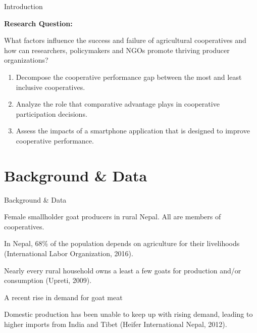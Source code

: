 \documentclass[aspectratio=169]{beamer}
\newenvironment{wideitemize}{\itemize\addtolength{\itemsep}{10pt}}{\enditemize}
\begin{document}
\begin{frame}{Introduction}

\textbf{Research Question:} \vspace{.5cm}
    \begin{wideitemize}
        \item What factors influence the success and failure of agricultural cooperatives and how can researchers, policymakers and NGOs promote thriving producer organizations? \vspace{.25cm}
            \begin{enumerate}
                \item Decompose the cooperative performance gap between the most and least inclusive cooperatives. \vspace{.25cm}
                \item Analyze the role that comparative advantage plays in cooperative participation decisions. \vspace{.25cm}
                \item Assess the impacts of a smartphone application that is designed to improve cooperative performance.
            \end{enumerate}
    \end{wideitemize}
\end{frame}

\section{Background \& Data}

\begin{frame}{Background \& Data}
    \begin{wideitemize}
        \item Female smallholder goat producers in rural Nepal. All are members of cooperatives. 
        \item In Nepal, 68\% of the population depends on agriculture for their livelihoods (International Labor Organization, 2016). 
        \item Nearly every rural household owns a least a few goats for production and/or consumption (Upreti, 2009). 
        \item A recent rise in demand for goat meat \vspace{.25cm}
        \begin{wideitemize}
            \item Domestic production has been unable to keep up with rising demand, leading to higher imports from India and Tibet (Heifer International Nepal, 2012).
        \end{wideitemize}
    \end{wideitemize}
\end{frame}
\end{document}
